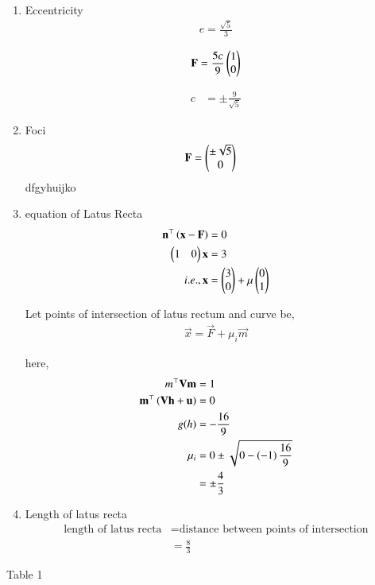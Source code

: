 \documentclass[journal,12pt,twocolumn]{IEEEtran}
\begin{document}
\begin{enumerate}
\item Eccentricity
\begin{align}
	e = \frac{\sqrt{5}}{3} 
\end{align}

\begin{align}
	\mathbf{F} = \frac{5c}{9}\begin{pmatrix}1\\0\end{pmatrix}
\end{align}

\begin{align}
	c &= \pm \frac{9}{\sqrt{5}}
\end{align}

\item Foci 
\begin{align}
	\mathbf{F} &= \begin{pmatrix} \pm \sqrt{5} \\0\end{pmatrix}
\end{align}
dfgyhuijko
\item equation of Latus Recta
\begin{align}
	\mathbf{n}^{\top} \left(\mathbf{x} -\mathbf{F}\right) &= 0\\
	\begin{pmatrix} 1&0\end{pmatrix} \mathbf{x} &= 3\\
	i.e., \mathbf{x} &= \begin{pmatrix}3\\0\end{pmatrix} + \mu \begin{pmatrix}0\\1\end{pmatrix} 
\end{align}

Let points of intersection of latus rectum and curve be,
\begin{align}
	\vec{x} = \vec{F} + \mu_i \vec{m}
\end{align}


here,
\begin{align}
	m^{\top}\mathbf{V}\mathbf{m} &= 1\\
	\mathbf{m}^{\top}\left(\mathbf{V}\mathbf{h}+\mathbf{u}\right) &= 0 \\
	g(h) &= -\frac{16}{9}\\
	{\mu}_i &= {0 \pm \sqrt{0 - \left(-1\right)\frac{16}{9}}}\\
		&= \pm \frac{4}{3}
\end{align}

\item Length of latus recta
\begin{align}
\text{length of latus recta} &= \text{distance between points of intersection}\\
&= \frac{8}{3}
\end{align}

\end{enumerate}

\begin{table}[h!]
\begin{center}

\end{center}
\caption{Table 1}
\label{tab:}
\end{table}
\end{document}
